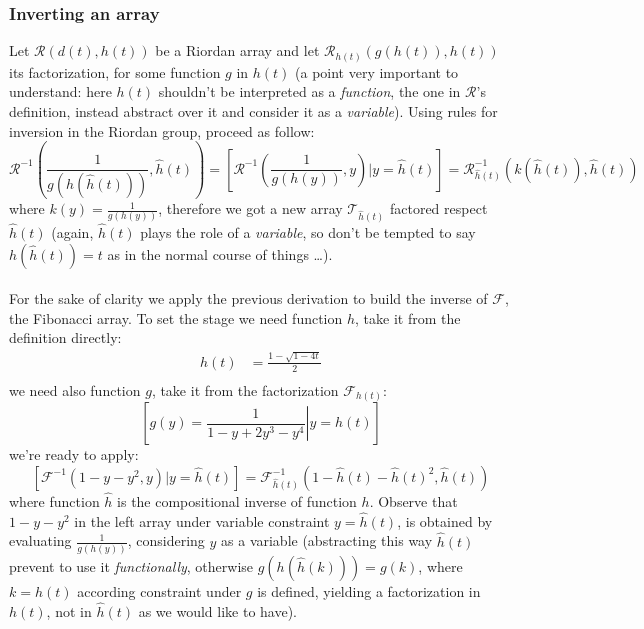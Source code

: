 \documentclass[11pt,a4paper]{article} %
\begin{document}
    \subsubsection{Inverting an array}

    Let $\mathcal{R}\left(d(t),h(t)\right)$ be a Riordan array and let 
    $\mathcal{R}_{h(t)}\left(g(h(t)),h(t)\right)$ its factorization, for some
    function $g$ in $h(t)$ (a point very important to understand: here $h(t)$ shouldn't be
    interpreted as a \emph{function}, the one in $\mathcal{R}$'s definition, instead
    abstract over it and consider it as a \emph{variable}). 
    Using rules for inversion in the Riordan group, proceed as follow:
    \begin{displaymath}
        \mathcal{R}^{-1}\left(\frac{1}{g(h(\hat{h}(t)))},\hat{h}(t)\right)=
        \left[\mathcal{R}^{-1}\left(\frac{1}{g(h(y))},y\right) | y = \hat{h}(t) \right]=
        \mathcal{R}_{\hat{h}(t)}^{-1}\left(k(\hat{h}(t)),\hat{h}(t)\right)
    \end{displaymath}
    where $k(y)=\frac{1}{g(h(y))}$, therefore we got a new array $\mathcal{T}_{\hat{h}(t)}$
    factored respect $\hat{h}(t)$ (again, $\hat{h}(t)$ plays the role of a \emph{variable},
    so don't be tempted to say $h(\hat{h}(t))=t$ as in the normal course of things \ldots).
    \\\\
    For the sake of clarity we apply the previous derivation to build the inverse of $\mathcal{F}$,
    the Fibonacci array.
    To set the stage we need function $h$, take it from the definition directly:
    \begin{displaymath}
        \begin{split}
            h(t)&=\frac{1-\sqrt{1-4t}}{2}\\
        \end{split}
    \end{displaymath}
    we need also function $g$, take it from the factorization $\mathcal{F}_{h(t)}$:
    \begin{displaymath}
        \left[g(y)=\left.\frac{1}{1-y+2y^3-y^4} \right| y=h(t)\right]
    \end{displaymath}
    we're ready to apply:
    \begin{displaymath}
        \left[\mathcal{F}^{-1}\left(1-y-y^2,y\right) | y = \hat{h}(t) \right]=
        \mathcal{F}_{\hat{h}(t)}^{-1}\left(1-\hat{h}(t)-\hat{h}(t)^2,\hat{h}(t)\right)
    \end{displaymath}
    where function $\hat{h}$ is the compositional inverse of function $h$. Observe that
    $1-y-y^2$ in the left array under variable constraint $y=\hat{h}(t)$, is obtained by
    evaluating $\frac{1}{g(h(y))}$, considering $y$ as a variable (abstracting this way $\hat{h}(t)$
    prevent to use it \emph{functionally}, otherwise $g(h(\hat{h}(k)))=g(k)$, where $k=h(t)$
    according constraint under $g$ is defined, yielding a factorization in $h(t)$, not in $\hat{h}(t)$
    as we would like to have).
    
\end{document}
